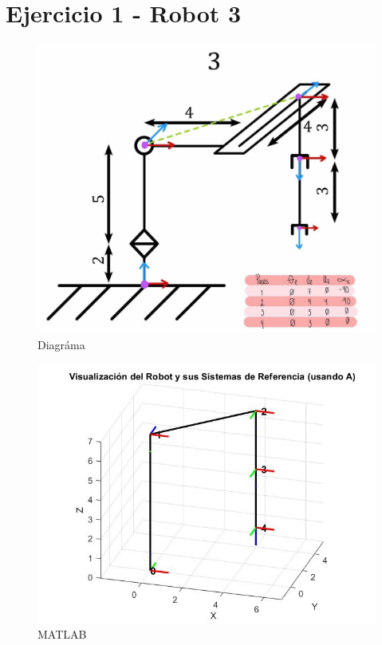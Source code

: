\section{Ejercicio 1 - Robot 3}
\begin{figure}[h]
	\centering
	\includegraphics[width=0.63\linewidth]{../img/ejercicio_3-dibujo}
	\caption{Diagráma}
	\label{fig:ejercicio3-dibujo}
\end{figure}
\begin{figure}[h]
	\centering
	\includegraphics[width=0.66\linewidth]{../img/ejercicio_3-matlab}
	\caption{MATLAB}
	\label{fig:ejercicio3-matlab}
\end{figure}
